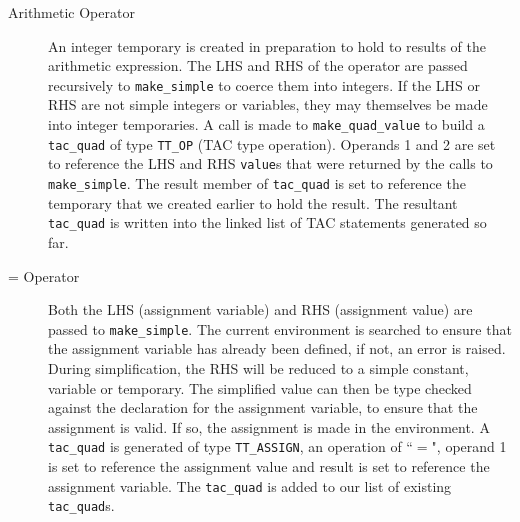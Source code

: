 \begin{description}
	\item[Arithmetic Operator] An integer temporary is created in preparation to hold to results of the arithmetic expression. The LHS and RHS of the operator are passed recursively to \verb!make_simple! to coerce them into integers. If the LHS or RHS are not simple integers or variables, they may themselves be made into integer temporaries. A call is made to \verb!make_quad_value! to build a \verb!tac_quad! of type \verb!TT_OP! (TAC type operation). Operands 1 and 2 are set to reference the LHS and RHS \verb!value!s that were returned by the calls to \verb!make_simple!. The result member of \verb!tac_quad! is set to reference the temporary that we created earlier to hold the result. The resultant \verb!tac_quad! is written into the linked list of TAC statements generated so far.
	\item[= Operator] Both the LHS (assignment variable) and RHS (assignment value) are passed to \verb!make_simple!. The current environment is searched to ensure that the assignment variable has already been defined, if not, an error is raised. During simplification, the RHS will be reduced to a simple constant, variable or temporary. The simplified value can then be type checked against the declaration for the assignment variable, to ensure that the assignment is valid. If so, the assignment is made in the environment. A \verb!tac_quad! is generated of type \verb!TT_ASSIGN!, an operation of ``$=$", operand 1 is set to reference the assignment value and result is set to reference the assignment variable. The \verb!tac_quad! is added to our list of existing \verb!tac_quad!s.

\end{description}
